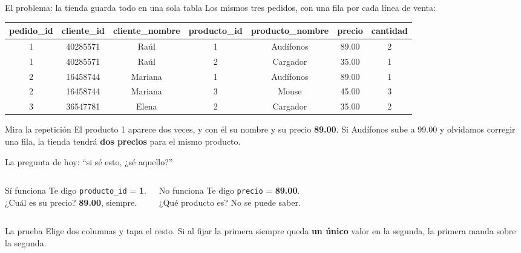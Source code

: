 \documentclass[aspectratio=169,10pt,c]{beamer}
\newenvironment{tablaventa}{\footnotesize\setlength\tabcolsep{4.5pt}}{}
\begin{document}
\begin{frame}{El problema: la tienda guarda todo en una sola tabla}
\small Los mismos tres pedidos, con una fila por cada línea de venta:
\vspace{0.2cm}
\begin{center}
\begin{tablaventa}
\begin{tabular}{ccccccc}
\toprule
\bfseries pedido\_id & \bfseries cliente\_id & \bfseries cliente\_nombre & \bfseries producto\_id & \bfseries producto\_nombre & \bfseries precio & \bfseries cantidad \\
\midrule
1 & 40285571 & Raúl    & 1 & Audífonos & 89.00 & 2 \\
1 & 40285571 & Raúl    & 2 & Cargador  & 35.00 & 1 \\
2 & 16458744 & Mariana & 1 & Audífonos & 89.00 & 1 \\
2 & 16458744 & Mariana & 3 & Mouse     & 45.00 & 3 \\
3 & 36547781 & Elena   & 2 & Cargador  & 35.00 & 2 \\
\bottomrule
\end{tabular}
\end{tablaventa}
\end{center}
\vspace{0.4cm}
\begin{alertblock}{Mira la repetición}
\small El producto 1 aparece dos veces, y con él su nombre y su precio \textbf{89.00}. Si Audífonos sube a 99.00 y olvidamos corregir una fila, la tienda tendrá \textbf{dos precios} para el mismo producto.
\end{alertblock}
\end{frame}

\begin{frame}{La pregunta de hoy: ``si sé esto, ¿sé aquello?''}
\begin{columns}[T,onlytextwidth]
\begin{exampleblock}{Sí funciona}
\small Te digo \texttt{producto\_id} = \textbf{1}.\\
¿Cuál es su precio? \textbf{89.00}, siempre.
\end{exampleblock}
\begin{alertblock}{No funciona}
\small Te digo \texttt{precio} = \textbf{89.00}.\\
¿Qué producto es? No se puede saber.
\end{alertblock}
\end{columns}
\vspace{0.45cm}
\begin{block}{La prueba}
Elige dos columnas y tapa el resto. Si al fijar la primera siempre queda \textbf{un único} valor en la segunda, la primera manda sobre la segunda.
\end{block}
\end{frame}
\end{document}
